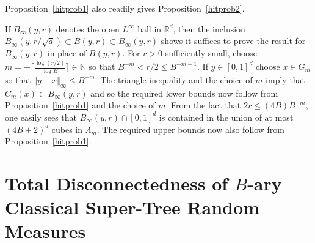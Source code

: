 \documentclass[12pt]{article}
\makeatletter
\renewenvironment{proof}[1][\proofname]{%
\par\pushQED{\qed}\normalfont%
\topsep6\p@\@plus6\p@\relax
\trivlist\item[\hskip\labelsep\bfseries#1\@addpunct{.}]%
\ignorespaces
}{%
\popQED\endtrivlist\@endpefalse
}
\numberwithin{theorem}{section}
\theoremstyle{def}
\numberwithin{equation}{section}
\renewcommand{\P}{\mathbb{P}}
\newcommand{\R}{\mathbb{R}}
\newcommand{\N}{\mathbb{N}}
\newcommand{\veps}{\varepsilon}
\makeatother
\begin{document}
Proposition~\ref{hitprob1} also readily gives Proposition~\ref{hitprob2}. 
\begin{proof}[Proof of Proposition~\ref{hitprob2}.] If $B_\infty(y,r)$ denotes the open $L^\infty$ ball in $\R^d$, then the inclusion $B_\infty(y,r/\sqrt d)\subset B(y,r)\subset B_\infty(y,r)$ shows it suffices to prove the result for $B_\infty(y,r)$ in place of $B(y,r)$. 
For
 $r>0$ sufficiently small, 
choose $m= - \lceil \frac{\log(r/2) }{ \log B} \rceil\in\N$ so that $B^{-m}<r/2\le B^{-m+1}$. 
If $y\in [0,1]^d$ choose $x\in G_m$ so that $\Vert y-x\Vert_\infty\le B^{-m}$. The triangle inequality and the choice of $m$ imply that $C_m(x)\subset B_\infty(y,r)$ and so the required lower bounds now follow from Proposition~\ref{hitprob1} and the choice of $m$.  From the fact that $2r\le (4B)B^{-m}$, one easily sees that $B_\infty(y,r)\cap [0,1]^d$ is contained in the union of at most $(4B+2)^d$ cubes in $\Lambda_m$.  The required upper bounds now also follow from Proposition~\ref{hitprob1}.
\end{proof}

\section{Total Disconnectedness of $B$-ary Classical Super-Tree Random Measures}\label{secTDBary}
\end{document}
